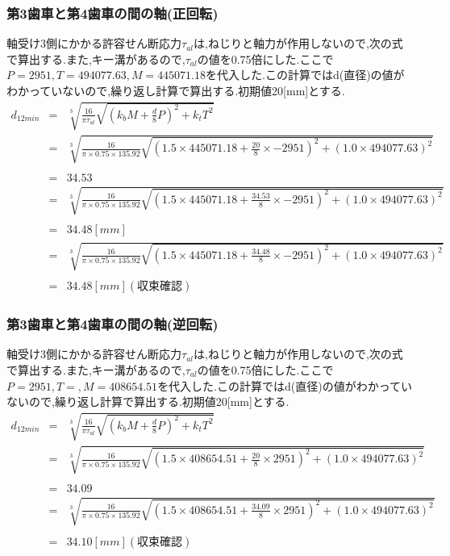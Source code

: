 \documentclass[a4j,twoside,openright,11pt]{jreport}
\begin{document}
\subsubsection{第3歯車と第4歯車の間の軸(正回転)}
軸受け3側にかかる許容せん断応力$\tau_{al}$は,ねじりと軸力が作用しないので,次の式で算出する.また,キー溝があるので,$\tau_{al}$の値を0.75倍にした.ここで$P=2951,T=494077.63, M=445071.18$を代入した.この計算ではd(直径)の値がわかっていないので,繰り返し計算で算出する.初期値20[mm]とする.
\begin{eqnarray}
d_{12min}&=& \sqrt [3]{ \frac{16}{\pi \tau_{al}}\sqrt{(k_bM+\frac{d}{8}P)^2+k_tT^2} }\\
       &=& \sqrt [3]{ \frac{16}{\pi \times 0.75 \times 135.92} \sqrt{(1.5 \times 445071.18 +\frac{20}{8}\times -2951)^2+(1.0 \times 494077.63)^2} }\nonumber\\
\\
       &=&34.53\\
       &=& \sqrt [3]{ \frac{16}{\pi \times 0.75 \times 135.92} \sqrt{(1.5 \times 445071.18 +\frac{34.53}{8}\times -2951)^2+(1.0 \times 494077.63)^2} }\nonumber\\
\\
         &=& 34.48[mm]\\
       &=& \sqrt [3]{ \frac{16}{\pi \times 0.75 \times 135.92} \sqrt{(1.5 \times 445071.18 +\frac{34.48}{8}\times -2951)^2+(1.0 \times 494077.63)^2} }\nonumber\\
\\
         &=& 34.48[mm](収束確認)
\end{eqnarray}
\subsubsection{第3歯車と第4歯車の間の軸(逆回転)}
軸受け3側にかかる許容せん断応力$\tau_{al}$は,ねじりと軸力が作用しないので,次の式で算出する.また,キー溝があるので,$\tau_{al}$の値を0.75倍にした.ここで$P=2951,T=, M=408654.51$を代入した.この計算ではd(直径)の値がわかっていないので,繰り返し計算で算出する.初期値20[mm]とする.
\begin{eqnarray}
d_{12min}&=& \sqrt [3]{ \frac{16}{\pi \tau_{al}}\sqrt{(k_bM+\frac{d}{8}P)^2+k_tT^2} }\\
       &=& \sqrt [3]{ \frac{16}{\pi \times 0.75 \times 135.92} \sqrt{(1.5 \times 408654.51 +\frac{20}{8}\times 2951)^2+(1.0 \times 494077.63)^2} }\nonumber\\
\\
       &=&34.09\\
       &=& \sqrt [3]{ \frac{16}{\pi \times 0.75 \times 135.92} \sqrt{(1.5 \times 408654.51 +\frac{34.09}{8}\times 2951)^2+(1.0 \times 494077.63)^2} }\nonumber\\
\\
         &=& 34.10[mm](収束確認)
\end{eqnarray}
\end{document}
